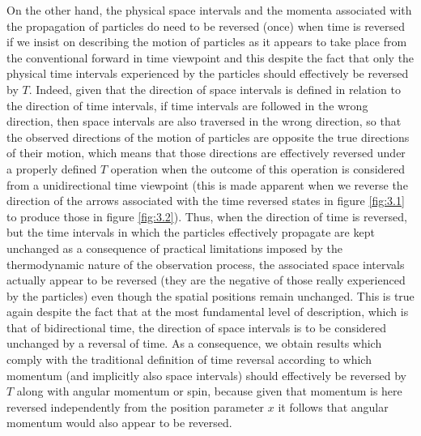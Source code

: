 \documentclass[notitlepage,12pt]{report}
\begin{document}
On the other hand, the physical space intervals and the momenta associated with the propagation of particles do need to be reversed (once) when time is reversed if we insist on describing the motion of particles as it appears to take place from the conventional forward in time viewpoint and this despite the fact that only the physical time intervals experienced by the particles should effectively be reversed by $T$. Indeed, given that the direction of space intervals is defined in relation to the direction of time intervals, if time intervals are followed in the wrong direction, then space intervals are also traversed in the wrong direction, so that the observed directions of the motion of particles are opposite the true directions of their motion, which means that those directions are effectively reversed under a properly defined $T$ operation when the outcome of this operation is considered from a unidirectional time viewpoint (this is made apparent when we reverse the direction of the arrows associated with the time reversed states in figure \ref{fig:3.1} to produce those in figure \ref{fig:3.2}). Thus, when the direction of time is reversed, but the time intervals in which the particles effectively propagate are kept unchanged as a consequence of practical limitations imposed by the thermodynamic nature of the observation process, the associated space intervals actually appear to be reversed (they are the negative of those really experienced by the particles) even though the spatial positions remain unchanged. This is true again despite the fact that at the most fundamental level of description, which is that of bidirectional time, the direction of space intervals is to be considered unchanged by a reversal of time. As a consequence, we obtain results which comply with the traditional definition of time reversal according to which momentum (and implicitly also space intervals) should effectively be reversed by $T$ along with angular momentum or spin, because given that momentum is here reversed independently from the position parameter $x$ it follows that angular momentum would also appear to be reversed.
\end{document}
